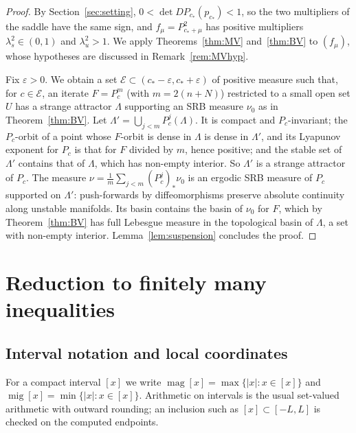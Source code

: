 \documentclass[11pt]{amsart}
\theoremstyle{definition}
\theoremstyle{remark}
\newcommand{\magn}{\operatorname{mag}}
\newcommand{\mig}{\operatorname{mig}}
\newcommand{\ival}[1]{[#1]}
\newcommand{\cs}{c_*}
\begin{document}
\begin{proof}
By Section~\ref{sec:setting}, $0<\det DP_{\cs}(p_{\cs})<1$, so the two multipliers of the saddle have the
same sign, and $f_\mu=P_{\cs+\mu}^2$ has positive multipliers $\lambda_s^2\in(0,1)$ and $\lambda_u^2>1$. We
apply Theorems~\ref{thm:MV} and~\ref{thm:BV} to $(f_\mu)$, whose hypotheses are discussed in
Remark~\ref{rem:MVhyp}.

Fix $\varepsilon>0$. We obtain a set $\mathcal E\subset(\cs-\varepsilon,\cs+\varepsilon)$ of positive measure
such that, for $c\in\mathcal E$, an iterate $F=P_c^{m}$ (with $m=2(n+N)$) restricted to a small open set $U$
has a strange attractor $\Lambda$ supporting an SRB measure $\nu_0$ as in Theorem~\ref{thm:BV}. Let
$\Lambda'=\bigcup_{j<m}P_c^j(\Lambda)$. It is compact and $P_c$-invariant; the $P_c$-orbit of a point whose
$F$-orbit is dense in $\Lambda$ is dense in $\Lambda'$, and its Lyapunov exponent for $P_c$ is that for $F$
divided by $m$, hence positive; and the stable set of $\Lambda'$ contains that of $\Lambda$, which has non-empty
interior. So $\Lambda'$ is a strange attractor of $P_c$. The measure $\nu=\frac1m\sum_{j<m}(P_c^j)_*\nu_0$ is
an ergodic SRB measure of $P_c$ supported on $\Lambda'$: push-forwards by diffeomorphisms preserve absolute
continuity along unstable manifolds. Its basin contains the basin of $\nu_0$ for $F$, which by
Theorem~\ref{thm:BV} has full Lebesgue measure in the topological basin of $\Lambda$, a set with non-empty
interior. Lemma~\ref{lem:suspension} concludes the proof.
\end{proof}

\section{Reduction to finitely many inequalities}\label{sec:reduction}

\subsection{Interval notation and local coordinates}\label{sec:notation}
For a compact interval $\ival{x}$ we write $\magn\ival{x}=\max\{|x|:x\in\ival{x}\}$ and
$\mig\ival{x}=\min\{|x|:x\in\ival{x}\}$. Arithmetic on intervals is the usual set-valued arithmetic with
outward rounding; an inclusion such as $\ival{x}\subset[-L,L]$ is checked on the computed endpoints.
\end{document}
